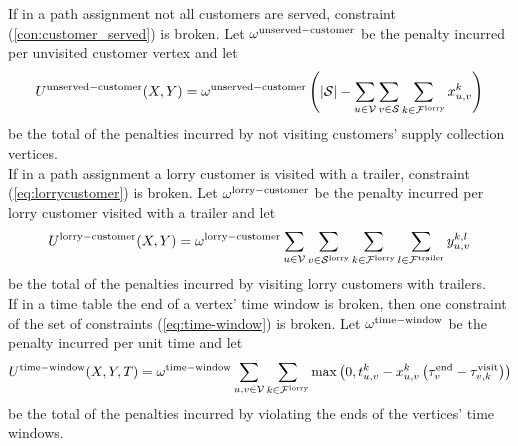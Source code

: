 



 If in a path assignment  not all customers are served, constraint
(\ref{con:customer_served})
is broken.
Let
$\omega^{\rm unserved-customer}$
be the penalty incurred per unvisited customer vertex and
let
\begin{align}
	U^{\rm unserved-customer}(X,Y) =
	 \omega^{\rm unserved-customer} \left( |\mathcal S| -
	 \sum_{u \in \mathcal V}
	\sum_{v \in \mathcal S}
	\sum_{k \in \mathcal F^{\rm lorry}}
x^k_{u,v}
\right)
\end{align}
 be the total of the penalties incurred by not visiting customers' supply collection vertices. \\

If in a path assignment a lorry customer is visited with a trailer, constraint
(\ref{eq:lorrycustomer}) is broken.
Let  $\omega^{\rm lorry-customer}$ be the penalty incurred per lorry customer visited with a trailer and let
\begin{align}
	U^{\rm lorry-customer}(X,Y) =
	\omega^{\rm lorry-customer}
	\sum_{u \in \mathcal V }
	\sum_{v \in \mathcal S^{\rm lorry} }
	\sum_{k \in \mathcal F^{\rm lorry} }
	\sum_{l \in \mathcal F^{\rm trailer} }
	 y^{k,l}_{u,v}
\end{align}
be the total of the penalties incurred by visiting lorry customers with trailers. \\

If in a time table the end of a vertex' time window is broken, then one constraint of the set of constraints
(\ref{eq:time-window}) is broken.
Let  $\omega^{\rm time-window}$ be the penalty incurred per unit time and let
\begin{align}
  \label{pen:time}
	U^{\rm time-window}(X,Y,T) =
	\omega^{\rm time-window}
	\sum_{u,v \in \mathcal V} \sum_{k \in \mathcal F^{\rm lorry}}
	\max \left( 0,  t^k_{u,v}  -
	 x^{k}_{u,v} \left(
	\tau^{\rm end}_v - \tau^{\rm visit}_{v,k}
	\right)
	 \right)
\end{align}
be the total of the penalties incurred by violating the ends of the vertices' time windows. \\


